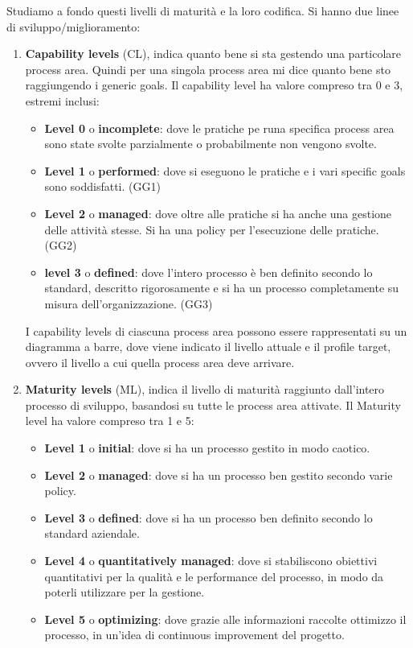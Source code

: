 Studiamo a fondo questi livelli di maturità e la loro codifica. Si hanno due linee di sviluppo/miglioramento:
\begin{enumerate}
    \item \textbf{Capability levels} (CL), indica quanto bene si sta gestendo una particolare process area. Quindi per una singola process area mi dice quanto bene sto raggiungendo i generic goals. Il capability level ha valore compreso tra 0 e 3, estremi inclusi:
    \begin{itemize}
        \item \textbf{Level 0} o \textbf{incomplete}: dove le pratiche pe runa specifica process area sono state svolte parzialmente o probabilmente non vengono svolte.
        \item \textbf{Level 1} o \textbf{performed}: dove si eseguono le pratiche e i vari specific goals sono soddisfatti. (GG1)
        \item \textbf{Level 2} o \textbf{managed}: dove oltre alle pratiche si ha anche una gestione delle attività stesse. Si ha una policy per l'esecuzione delle pratiche. (GG2)
        \item \textbf{level 3} o \textbf{defined}: dove l'intero processo è ben definito secondo lo standard, descritto rigorosamente e si ha un processo completamente su misura dell'organizzazione. (GG3)
    \end{itemize}

    I capability levels di ciascuna process area possono essere rappresentati su un diagramma a barre, dove viene indicato il livello attuale e il profile target, ovvero il livello a cui quella process area deve arrivare.
    \item \textbf{Maturity levels} (ML), indica il livello di maturità raggiunto dall'intero processo di sviluppo, basandosi su tutte le process area attivate. Il Maturity level ha valore compreso tra 1 e 5:
    \begin{itemize}
        \item \textbf{Level 1} o \textbf{initial}: dove si ha un processo gestito in modo caotico.
        \item \textbf{Level 2} o \textbf{managed}: dove si ha un processo ben gestito secondo varie policy.
        \item \textbf{Level 3} o \textbf{defined}: dove si ha un processo ben definito secondo lo standard aziendale.
        \item \textbf{Level 4} o \textbf{quantitatively managed}: dove si stabiliscono obiettivi quantitativi per la qualità e le performance del processo, in modo da poterli utilizzare per la gestione.
        \item \textbf{Level 5} o \textbf{optimizing}: dove grazie alle informazioni raccolte ottimizzo il processo, in un'idea di continuous improvement del progetto.
    \end{itemize}
\end{enumerate}

